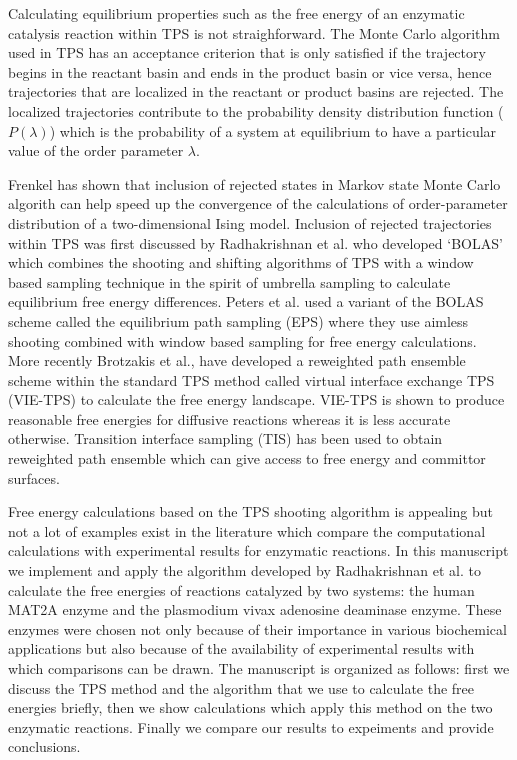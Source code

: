\documentclass[journal=jpcbfk,manuscript=article,layout=twocolumn]{achemso}
\begin{document}
Calculating equilibrium properties such as the free energy of an enzymatic 
catalysis reaction within TPS is not straighforward. 
The Monte Carlo algorithm used in TPS has an acceptance criterion that 
is only satisfied if the trajectory begins in the reactant basin and ends in 
the product basin or vice versa, hence trajectories that are localized in the 
reactant or product basins are rejected. The localized trajectories contribute
to the probability density distribution function ($P(\lambda)$) which is the 
probability of a system at equilibrium to have a particular value of the 
order parameter $\lambda$. \cite{Dellago09AdvCompSimAppp167} 

Frenkel has shown that inclusion of rejected states in Markov state Monte 
Carlo algorith can help speed up the convergence of the calculations of 
order-parameter distribution of a two-dimensional
Ising model. \cite{Frenkel04ProcNatAcadSci101p17571}
Inclusion of rejected trajectories within TPS was first discussed by Radhakrishnan 
et al. \cite{Radhakrishnan04JChemPhys121p2436} who developed `BOLAS' which combines 
the shooting and shifting algorithms of TPS with a window based sampling technique 
in the spirit of umbrella sampling to calculate equilibrium free energy 
differences. Peters et al. used a variant of the BOLAS scheme called the 
equilibrium path sampling (EPS) where they use aimless shooting 
combined with window based sampling for free energy calculations. 
\cite{Peters08JAmChemSoc130p17342,Beckham10epsbook} 
More recently Brotzakis et al., \cite{Brotzakis19JChemPhys151p174111}
have developed a reweighted path ensemble scheme within the standard TPS method 
called virtual interface exchange TPS (VIE-TPS) to calculate the free energy 
landscape. VIE-TPS is shown to produce reasonable free energies for 
diffusive reactions whereas it is less accurate otherwise.
Transition interface sampling (TIS) has been used to obtain 
reweighted path ensemble which can give access to free energy 
and committor surfaces. \cite{Rogal10JChemPhys17p174109}

Free energy calculations based on the TPS shooting algorithm is 
appealing but not a lot of examples exist in the literature 
which compare the computational calculations with experimental
results for enzymatic reactions.  
In this manuscript we implement and apply the 
algorithm developed by Radhakrishnan et al. \cite{Radhakrishnan04JChemPhys121p2436} 
to calculate the free energies of reactions catalyzed by two systems:
the human MAT2A enzyme and the plasmodium vivax adenosine deaminase 
enzyme. \cite{Luo07JAmChemSoc129p8008,Ho09Biochemistry48p9618}
These enzymes were chosen not only because of their importance in various 
biochemical applications but also because of the availability of experimental 
results with which comparisons can be drawn. The manuscript is organized as 
follows: first we discuss the TPS method and the algorithm that we use 
to calculate the free energies briefly, then we show calculations which apply this 
method on the two enzymatic reactions. Finally we compare our results to expeiments
and provide conclusions. 
\end{document}
